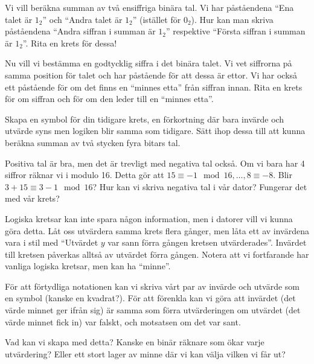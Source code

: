 \begin{problem}
	Vi vill beräkna summan av två ensiffriga binära tal. Vi har påståendena ``Ena talet är \(1_2\)'' och ``Andra talet är \(1_2\)'' (istället för \(0_2\)). Hur kan man skriva påståendena ``Andra siffran i summan är \(1_2\)'' respektive ``Första siffran i summan är \(1_2\)''. Rita en krets för dessa!
\end{problem}

\begin{problem}
	Nu vill vi bestämma en godtycklig siffra i det binära talet. Vi vet siffrorna på samma position för talet och har påstående för att dessa är ettor. Vi har också ett påstående för om det finns en ``minnes etta'' från siffran innan. Rita en krets för om siffran och för om den leder till en ``minnes etta''.
\end{problem}

\begin{problem}
	Skapa en symbol för din tidigare krets, en förkortning där bara invärde och utvärde syns men logiken blir samma som tidigare. Sätt ihop dessa till att kunna beräkna summan av två stycken fyra bitars tal.
\end{problem}

\begin{problem}[Extra]
	Positiva tal är bra, men det är trevligt med negativa tal också. Om vi bara har 4 siffror räknar vi i modulo 16. Detta gör att \(15 \equiv -1 \mod 16, \dots , 8 \equiv -8\). Blir \(3 + 15 \equiv 3 - 1 \mod 16\)? Hur kan vi skriva negativa tal i vår dator? Fungerar det med vår krets?
\end{problem}

\begin{problem}[Extra]
	Logiska kretsar kan inte spara någon information, men i datorer vill vi kunna göra detta. Låt oss utvärdera samma krets flera gånger, men låta ett av invärdena vara i stil med ``Utvärdet \(y\) var sann förra gången kretsen utvärderades''. Invärdet till kretsen påverkas alltså av utvärdet förra gången. Notera att vi fortfarande har vanliga logiska kretsar, men kan ha ``minne''. 

	För att förtydliga notationen kan vi skriva vårt par av invärde och utvärde som en symbol (kanske en kvadrat?). För att förenkla kan vi göra att invärdet (det värde minnet ger ifrån sig) är samma som förra utvärderingen om utvärdet (det värde minnet fick in) var falskt, och motsatsen om det var sant.

	Vad kan vi skapa med detta? Kanske en binär räknare som ökar varje utvärdering? Eller ett stort lager av minne där vi kan välja vilken vi får ut?
\end{problem}


% 
